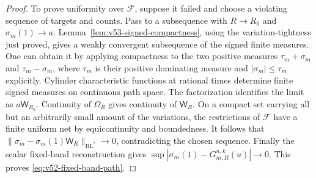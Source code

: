 \begin{proof}
To prove uniformity over $\mathcal F$, suppose it failed and choose
a violating sequence of targets and counts. Pass to a subsequence
with $R\to R_0$ and $\sigma_m(1)\to a$. Lemma~\ref{lem:v53-signed-compactness}, using the variation-tightness
just proved, gives a weakly convergent subsequence of the signed
finite measures. One can obtain it by applying compactness to the
two positive measures $\tau_m+\sigma_m$ and $\tau_m-\sigma_m$,
where $\tau_m$ is their positive dominating measure and
$|\sigma_m|\le\tau_m$ explicitly.
Cylinder characteristic functions at rational times determine finite
signed measures on continuous path space. The factorization identifies
the limit as $a\mathsf W_{R_0}$. Continuity of $\Omega_R$ gives
continuity of $\mathsf W_R$. On a compact set carrying all but an
arbitrarily small amount of the variations, the restrictions of
$\mathcal F$ have a finite uniform net by equicontinuity and boundedness.
It follows that
$\|\sigma_m-\sigma_m(1)\mathsf W_R\|_{\mathrm{BL}^*}\to0$,
contradicting the chosen sequence. Finally the scalar fixed-band
reconstruction gives
$\sup|\sigma_m(1)-G_{m,R}^{n,k}(u)|\to0$. This proves
\eqref{eq:v52-fixed-band-path}.
\end{proof}

